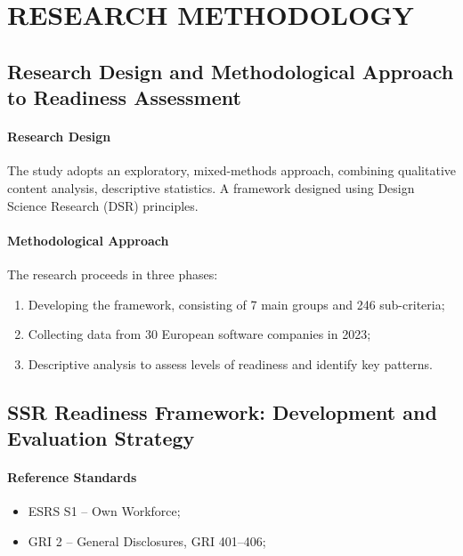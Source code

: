 \chapter{RESEARCH METHODOLOGY}

\section{Research Design and Methodological Approach to Readiness Assessment}

\subsubsection{Research Design}
The study adopts an exploratory, mixed-methods approach, 
combining qualitative content analysis, descriptive statistics. 
A framework designed using Design Science Research (DSR) principles.

\subsubsection{Methodological Approach}
The research proceeds in three phases:
\begin{enumerate}
    \item Developing the framework, consisting of 7 main groups and 246 sub-criteria;
    \item Collecting data from 30 European software companies in 2023;
    \item Descriptive analysis to assess levels of readiness and identify key patterns.
\end{enumerate}

\section{SSR Readiness Framework: Development and Evaluation Strategy}
\subsubsection{Reference Standards}
\begin{itemize}
    \item ESRS S1 -- Own Workforce;
    \item GRI 2 -- General Disclosures, GRI 401--406;
\end{itemize}

